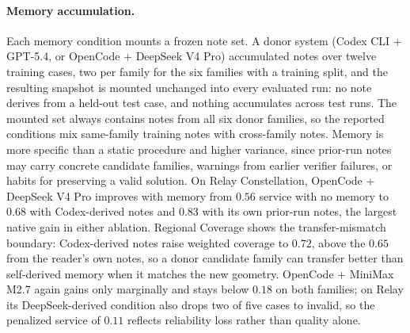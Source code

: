 \documentclass[11pt]{article}
\begin{document}
\paragraph{Memory accumulation.}
Each memory condition mounts a frozen note set. A donor system (Codex CLI + GPT-5.4, or OpenCode + DeepSeek V4 Pro) accumulated notes over twelve training cases, two per family for the six families with a training split, and the resulting snapshot is mounted unchanged into every evaluated run: no note derives from a held-out test case, and nothing accumulates across test runs. The mounted set always contains notes from all six donor families, so the reported conditions mix same-family training notes with cross-family notes. Memory is more specific than a static procedure and higher variance, since prior-run notes may carry concrete candidate families, warnings from earlier verifier failures, or habits for preserving a valid solution. On Relay Constellation, OpenCode + DeepSeek V4 Pro improves with memory from $0.56$ service with no memory to $0.68$ with Codex-derived notes and $0.83$ with its own prior-run notes, the largest native gain in either ablation. Regional Coverage shows the transfer-mismatch boundary: Codex-derived notes raise weighted coverage to $0.72$, above the $0.65$ from the reader's own notes, so a donor candidate family can transfer better than self-derived memory when it matches the new geometry. OpenCode + MiniMax M2.7 again gains only marginally and stays below $0.18$ on both families; on Relay its DeepSeek-derived condition also drops two of five cases to invalid, so the penalized service of $0.11$ reflects reliability loss rather than quality alone.
\end{document}
